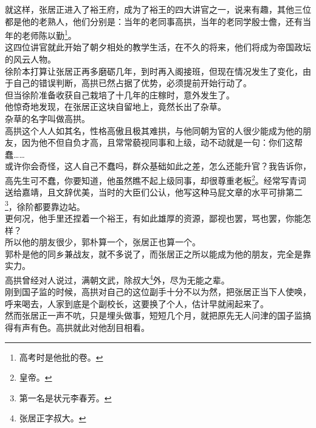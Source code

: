 \begin{multicols}{\theparacolNo}
就这样，张居正进入了裕王府，成为了裕王的四大讲官之一，说来有趣，其他三位都是他的老熟人，他们分别是：当年的老同事高拱，当年的老同学殷士儋，还有当年的老师陈以勤\footnote{高考时是他批的卷。}。\\

这四位讲官就此开始了朝夕相处的教学生活，在不久的将来，他们将成为帝国政坛的风云人物。\\

徐阶本打算让张居正再多磨砺几年，到时再入阁接班，但现在情况发生了变化，由于自己的错误判断，高拱已然占据了优势，必须提前开始行动了。\\

但当徐阶准备收获自己栽培了十几年的庄稼时，意外发生了。\\

他惊奇地发现，在张居正这块自留地上，竟然长出了杂草。\\

杂草的名字叫做高拱。\\

高拱这个人人如其名，性格高傲且极其难拱，与他同朝为官的人很少能成为他的朋友，因为他不但自负才高，且常常藐视同事和上级，动不动就是一句：你们这帮蠢……\\

或许你会奇怪，这人自己不蠢吗，群众基础如此之差，怎么还能升官？我告诉你，高先生可不蠢，你要知道，他虽然瞧不起上级同事，却很尊重老板\footnote{皇帝。}。经常写青词送给嘉靖，且文辞优美，当时的大臣们公认，他写这种马屁文章的水平可排第二\footnote{第一名是状元李春芳。}，徐阶都要靠边站。\\

更何况，他手里还捏着一个裕王，有如此雄厚的资源，鄙视也罢，骂也罢，你能怎样？\\

所以他的朋友很少，郭朴算一个，张居正也算一个。\\

郭朴是他的同乡兼战友，就不多说了，而张居正之所以能成为他的朋友，完全是靠实力。\\

高拱曾经对人说过，满朝文武，除叔大\footnote{张居正字叔大。}外，尽为无能之辈。\\

刚到国子监的时候，高拱对自己的这位副手十分不以为然，把张居正当下人使唤，呼来喝去，人家到底是个副校长，这要换了个人，估计早就闹起来了。\\

然而张居正一声不吭，只是埋头做事，短短几个月，就把原先无人问津的国子监搞得有声有色。高拱就此对他刮目相看。\\


\end{multicols}
